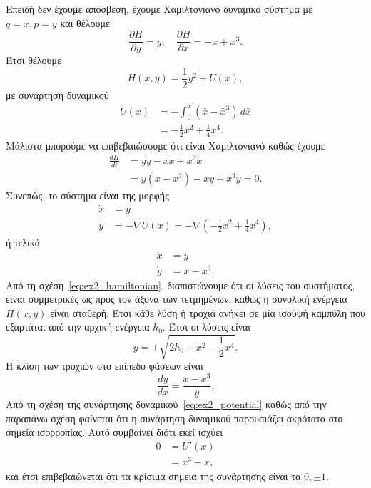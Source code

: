 \begin{solution}
    Επειδή δεν έχουμε απόσβεση, έχουμε Χαμιλτονιανό δυναμικό σύστημα με
    \( q = x, p = y \) και θέλουμε
    \begin{equation*}
        \frac{\partial H}{\partial y} = y, \quad
        \frac{\partial H}{\partial x} = -x + x^3.
    \end{equation*}
    Έτσι θέλουμε
    \begin{equation}\label{eq:ex2_hamiltonian}
        H(x, y) = \frac{1}{2}y^2 + U(x),
    \end{equation}
    με συνάρτηση δυναμικού
    \begin{align}\label{eq:ex2_potential}
        U(x) &= - \int_0^x \left(\bar{x} - \bar{x}^3 \right) \, d\bar{x}
        \nonumber \\
        &= -\frac{1}{2}x^2 + \frac{1}{4}x^4.
    \end{align}
    Μάλιστα μπορούμε να επιβεβαιώσουμε ότι είναι Χαμιλτονιανό καθώς έχουμε
    \begin{align*}
        \frac{dH}{dt}
        &= y\dot{y} - x\dot{x} + x^3\dot{x} \\
        &= y(x - x^3) - xy + x^3y = 0.
    \end{align*}
    Συνεπώς, το σύστημα είναι της μορφής
    \begin{align*}
        \dot{x} &= y \\
        \dot{y} &= -\nabla U(x) = -\nabla\left( -\frac{1}{2}x^2 +
        \frac{1}{4}x^4 \right),
    \end{align*}
    ή τελικά
    \begin{align*}
        \dot{x} &= y \\
        \dot{y} &= x - x^3.
    \end{align*}
    Από τη σχέση~\eqref{eq:ex2_hamiltonian}, διαπιστώνουμε ότι οι λύσεις του
    συστήματος, είναι συμμετρικές ως προς τον άξονα των τετμημένων, καθώς
    η συνολική ενέργεια \( H(x, y) \) είναι σταθερή. Έτσι κάθε λύση ή τροχιά
    ανήκει σε μία ισοϋψή καμπύλη που εξαρτάται από την αρχική ενέργεια
    \( h_0 \). Έτσι οι λύσεις είναι
    \begin{equation*}
        y = \pm \sqrt{2h_0 + x^2 - \frac{1}{2}x^4}.
    \end{equation*}
    Η κλίση των τροχιών στο επίπεδο φάσεων είναι
    \begin{equation*}
        \frac{dy}{dx} = \frac{x - x^3}{y}.
    \end{equation*}
    Από τη σχέση της συνάρτησης δυναμικού~\eqref{eq:ex2_potential} καθώς από
    την παραπάνω σχέση φαίνεται ότι η συνάρτηση δυναμικού παρουσιάζει ακρότατο
    στα σημεία ισορροπίας. Αυτό συμβαίνει διότι εκεί ισχύει
    \begin{align*}
        0 &= U'(x) \\
        &= x^3 - x,
    \end{align*}
    και έτσι επιβεβαιώνεται ότι τα κρίσιμα σημεία της συνάρτησης είναι τα
    \( 0, \pm 1 \).


\end{solution}
